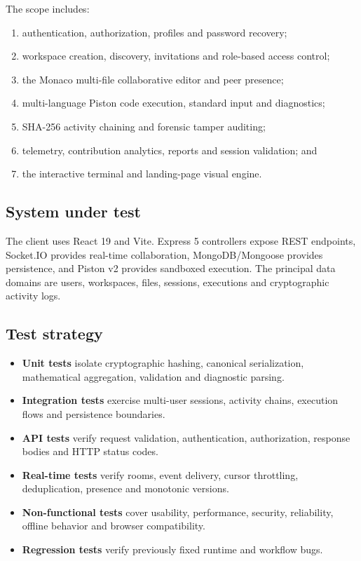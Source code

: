 \documentclass[11pt,a4paper]{article}
\begin{document}
The scope includes:
\begin{enumerate}
    \item authentication, authorization, profiles and password recovery;
    \item workspace creation, discovery, invitations and role-based access control;
    \item the Monaco multi-file collaborative editor and peer presence;
    \item multi-language Piston code execution, standard input and diagnostics;
    \item SHA-256 activity chaining and forensic tamper auditing;
    \item telemetry, contribution analytics, reports and session validation; and
    \item the interactive terminal and landing-page visual engine.
\end{enumerate}

\subsection{System under test}
The client uses React 19 and Vite. Express 5 controllers expose REST endpoints,
Socket.IO provides real-time collaboration, MongoDB/Mongoose provides persistence,
and Piston v2 provides sandboxed execution. The principal data domains are users,
workspaces, files, sessions, executions and cryptographic activity logs.

\subsection{Test strategy}
\begin{itemize}
    \item \textbf{Unit tests} isolate cryptographic hashing, canonical serialization,
    mathematical aggregation, validation and diagnostic parsing.
    \item \textbf{Integration tests} exercise multi-user sessions, activity chains,
    execution flows and persistence boundaries.
    \item \textbf{API tests} verify request validation, authentication, authorization,
    response bodies and HTTP status codes.
    \item \textbf{Real-time tests} verify rooms, event delivery, cursor throttling,
    deduplication, presence and monotonic versions.
    \item \textbf{Non-functional tests} cover usability, performance, security,
    reliability, offline behavior and browser compatibility.
    \item \textbf{Regression tests} verify previously fixed runtime and workflow bugs.
\end{itemize}
\end{document}
